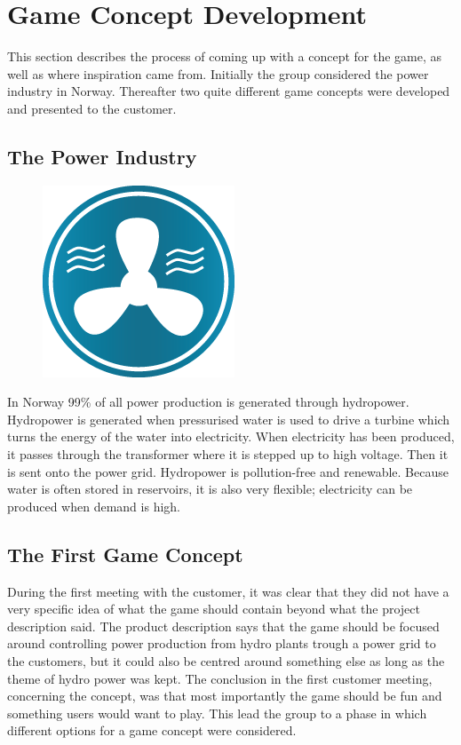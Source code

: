 \section{Game Concept Development}

This section describes the process of coming up with a concept for the game, as well as where inspiration came from. Initially the group considered the power industry in Norway. Thereafter two quite different game concepts were developed and presented to the customer.

\subsection{The Power Industry}

\begin{figure}
  \begin{center}
  \includegraphics[scale=0.5]{pictures/water_generator.png}
  \end{center}
\end{figure}

In Norway 99\% of all power production is generated through hydropower. Hydropower is generated when pressurised water is used to drive a turbine which turns the energy of the water into electricity. When electricity has been produced, it passes through the transformer where it is stepped up to high voltage. Then it is sent onto the power grid. Hydropower is pollution-free and renewable. Because water is often stored in reservoirs, it is also very flexible; electricity can be produced when demand is high. \cite{statkraftVannkraft}

\subsection{The First Game Concept}

During the first meeting with the customer, it was clear that they did not have a very specific idea of what the game should contain beyond what the project description said. The product description says that the game should be focused around controlling power production from hydro plants trough a power grid to the customers, but it could also be centred around something else as long as the theme of hydro power was kept. The conclusion in the first customer meeting, concerning the concept, was that most importantly the game should be fun and something users would want to play. This
lead the group to a phase in which different options for a game concept were considered.

